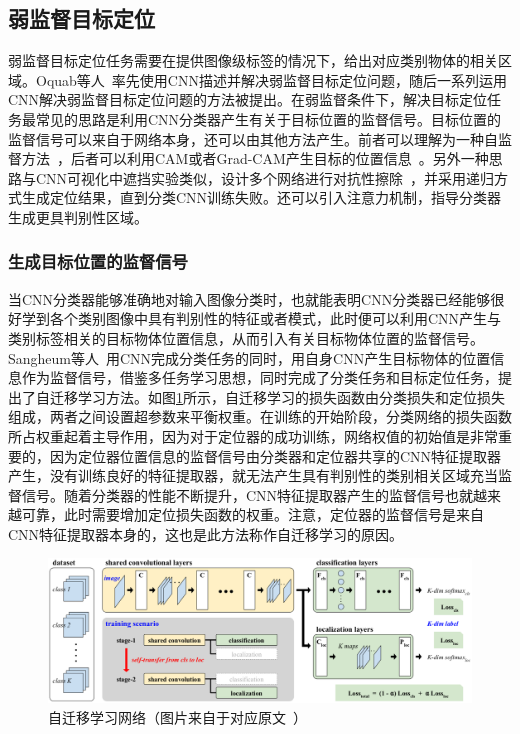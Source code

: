 \subsection{弱监督目标定位}
弱监督目标定位任务需要在提供图像级标签的情况下，给出对应类别物体的相关区域。Oquab等人~\cite{Oquab2015IsOL}率先使用CNN描述并解决弱监督目标定位问题，随后一系列运用CNN解决弱监督目标定位问题的方法被提出。在弱监督条件下，解决目标定位任务最常见的思路是利用CNN分类器产生有关于目标位置的监督信号。目标位置的监督信号可以来自于网络本身，还可以由其他方法产生。前者可以理解为一种自监督方法~\cite{2015Hwang}，后者可以利用CAM或者Grad-CAM产生目标的位置信息~\cite{Kim_2017_ICCV, Krishna2018}。另外一种思路与CNN可视化中遮挡实验类似，设计多个网络进行对抗性擦除~\cite{WeiFLCZY17, ZhangWF0H18}，并采用递归方式生成定位结果，直到分类CNN训练失败。还可以引入注意力机制，指导分类器生成更具判别性区域。

\subsubsection{生成目标位置的监督信号}
当CNN分类器能够准确地对输入图像分类时，也就能表明CNN分类器已经能够很好学到各个类别图像中具有判别性的特征或者模式，此时便可以利用CNN产生与类别标签相关的目标物体位置信息，从而引入有关目标物体位置的监督信号。Sangheum等人~\cite{2015Hwang}用CNN完成分类任务的同时，用自身CNN产生目标物体的位置信息作为监督信号，借鉴多任务学习思想，同时完成了分类任务和目标定位任务，提出了自迁移学习方法。如图\ref{fig:self_transfer_learning}所示，自迁移学习的损失函数由分类损失和定位损失组成，两者之间设置超参数来平衡权重。在训练的开始阶段，分类网络的损失函数所占权重起着主导作用，因为对于定位器的成功训练，网络权值的初始值是非常重要的，因为定位器位置信息的监督信号由分类器和定位器共享的CNN特征提取器产生，没有训练良好的特征提取器，就无法产生具有判别性的类别相关区域充当监督信号。随着分类器的性能不断提升，CNN特征提取器产生的监督信号也就越来越可靠，此时需要增加定位损失函数的权重。注意，定位器的监督信号是来自CNN特征提取器本身的，这也是此方法称作自迁移学习的原因。

\begin{figure}[h]
	\centering
	\includegraphics[width=1.0\textwidth]{figure/self_transfer_learning}
	\caption{自迁移学习网络（图片来自于对应原文~\cite{2015Hwang}）} 
	\label{fig:self_transfer_learning}
\end{figure}

